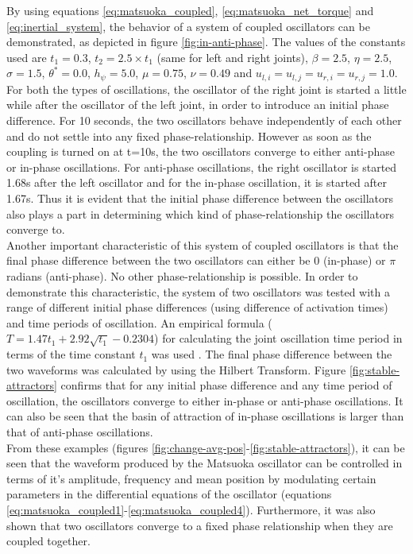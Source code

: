 \documentclass[12pt,twoside]{article}
\theoremstyle{plain}
\theoremstyle{definition}
\theoremstyle{remark}
\newcommand{\forceindent}{\leavevmode{\parindent=2em\indent}}
\begin{document}
\forceindent By using equations \ref{eq:matsuoka_coupled}, \ref{eq:matsuoka_net_torque} and  \ref{eq:inertial_system}, the behavior of a system of coupled oscillators can be demonstrated, as depicted in figure \ref{fig:in-anti-phase}. The values of the constants used are $t_1=0.3$, $t_2= 2.5 \times t_1$ (same for left and right joints), $\beta=2.5$,  $\eta=2.5$, $\sigma=1.5$, $\theta^*=0.0$, $h_{\psi}=5.0$, $\mu=0.75$, $\nu=0.49$ and $u_{l,i}=u_{l,j}=u_{r,i}=u_{r,j}=1.0$. For both the types of oscillations, the oscillator of the right joint is started a little while after the oscillator of the left joint, in order to introduce an initial phase difference. For 10 seconds, the two oscillators behave independently of each other and do not settle into any fixed phase-relationship. However as soon as the coupling is turned on at t=10s, the two oscillators converge to either anti-phase or in-phase oscillations. For anti-phase oscillations, the right oscillator is started 1.68s after the left oscillator and for the in-phase oscillation, it is started after 1.67s. Thus it is evident that the initial phase difference between the oscillators also plays a part in determining which kind of phase-relationship the oscillators converge to.\\
\forceindent Another important characteristic of this system of coupled oscillators is that the final phase difference between the two oscillators can either be 0 (in-phase) or $\pi$ radians (anti-phase). No other phase-relationship is possible. In order to demonstrate this characteristic, the system of two oscillators was tested with a range of different initial phase differences (using difference of activation times) and time periods of oscillation. An empirical formula ($T=1.47t_1 + 2.92\sqrt{t_1} - 0.2304$) for calculating the joint oscillation time period in terms of the time constant $t_1$ was used \cite{Ronsse2009}. The final phase difference between the two waveforms was calculated by using the Hilbert Transform. Figure \ref{fig:stable-attractors} confirms that for any initial phase difference and any time period of oscillation, the oscillators converge to either in-phase or anti-phase oscillations. It can also be seen that the basin of attraction of in-phase oscillations is larger than that of anti-phase oscillations.\\
\forceindent From these examples (figures \ref{fig:change-avg-pos}-\ref{fig:stable-attractors}), it can be seen that the waveform produced by the Matsuoka oscillator can be controlled in terms of it's amplitude, frequency and mean position by modulating certain parameters in the differential equations of the oscillator (equations \ref{eq:matsuoka_coupled1}-\ref{eq:matsuoka_coupled4}). Furthermore, it was also shown that two oscillators converge to a fixed phase relationship when they are coupled together.
\end{document}

